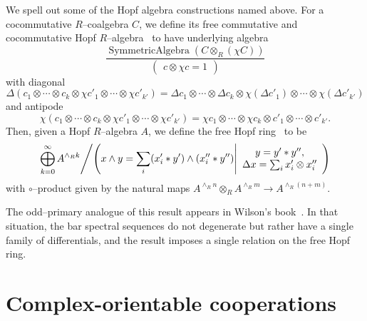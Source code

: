\begin{definition}
We spell out some of the Hopf algebra constructions named above.  For a cocommutative $R$--coalgebra $C$, we define its free commutative and cocommutative Hopf $R$--algebra~\cite{Takeuchi} to have underlying algebra \[\frac{\operatorname{SymmetricAlgebra} \left(C \otimes_R (\chi C)\right)}{\left( \begin{array}{c} c \otimes \chi c = 1 \end{array} \right)}\] with diagonal \[\Delta(c_1 \otimes \cdots \otimes c_k \otimes \chi c'_1 \otimes \cdots \otimes \chi c'_{k'}) = \Delta c_1 \otimes \cdots \otimes \Delta c_k \otimes \chi (\Delta c'_1) \otimes \cdots \otimes \chi(\Delta c'_{k'})\] and antipode \[\chi(c_1 \otimes \cdots \otimes c_k \otimes \chi c'_1 \otimes \cdots \otimes \chi c'_{k'}) = \chi c_1 \otimes \cdots \otimes \chi c_k \otimes c'_1 \otimes \cdots \otimes c'_{k'}.\]  Then, given a Hopf $R$--algebra $A$, we define the free Hopf ring~\cite[Definition 4.2, Proposition 2.16]{HuntonTurner} to be \[\left. \bigoplus_{k=0}^\infty A^{\wedge_R k} \middle/ \left(x \wedge y = \sum_i (x'_i \ast y') \wedge (x''_i \ast y'') \middle| \begin{array}{c} y = y' \ast y'', \\ \Delta x = \sum_i x'_i \otimes x''_i \end{array} \right) \right.\] with $\circ$--product given by the natural maps $A^{\wedge_R n} \otimes_R A^{\wedge_R m} \to A^{\wedge_R (n+m)}$.
\end{definition}

\begin{remark}
The odd--primary analogue of this result appears in Wilson's book~\cite[Theorem 8.5]{Wilson}.  In that situation, the bar spectral sequences do not degenerate but rather have a single family of differentials, and the result imposes a single relation on the free Hopf ring.
\end{remark}












\section{Complex-orientable cooperations}

